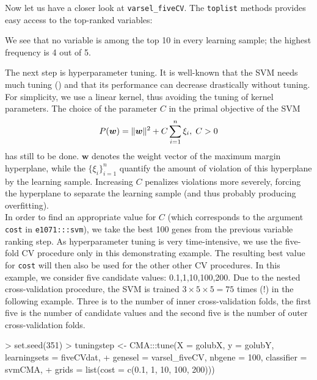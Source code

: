 Now let us have a closer look at \verb+varsel_fiveCV+. The \texttt{toplist}
methods provides easy access to the top-ranked variables:

\begin{Schunk}
\end{Schunk}

We see that no variable is among the top 10 in every learning sample; the highest
frequency is 4 out of 5.

The next step is hyperparameter tuning. It is well-known that the SVM
needs much tuning (\citet{Sta2005a}) and that its performance can decrease 
drastically without tuning. For simplicity, we use a linear kernel, thus avoiding the tuning of 
kernel parameters. The choice of the parameter $C$ in the primal objective
of the SVM
\begin{equation*}
P(\bm{w}) = \lVert\bm{w}\rVert^2 + C \sum_{i=1}^n \xi_i, \; C > 0
\end{equation*}
has still to be done. $$ denotes the weight vector of the maximum margin hyperplane,
while the $\{ \xi_i \}_{i=1}^n$ quantify the amount of violation of this
hyperplane by the learning sample. Increasing $C$ 
penalizes violations more severely, forcing the hyperplane to separate the
learning sample (and thus probably producing overfitting).\\
In order to find an appropriate value for $C$ (which corresponds to the argument
\texttt{cost} in \texttt{e1071:::svm}), we take the best 100 genes from the
previous variable ranking step. As hyperparameter tuning is very time-intensive, 
we use the five-fold CV procedure only
in this demonstrating example. The resulting best 
 value for \texttt{cost} will then also be used for the other other CV procedures. 
In this example, we consider five candidate values: 0.1,1,10,100,200.
Due to the nested cross-validation procedure, the SVM is trained 
$3   = 75$ times (!) in the following example. Three is to
the number of inner cross-validation folds, the first five is the number of candidate values
and the second five is the number of outer cross-validation folds.

\begin{Schunk}
\begin{Sinput}
> set.seed(351)
> tuningstep <- CMA:::tune(X = golubX, y = golubY, learningsets = fiveCVdat, 
+     genesel = varsel_fiveCV, nbgene = 100, classifier = svmCMA, 
+     grids = list(cost = c(0.1, 1, 10, 100, 200)))
\end{Sinput}
\end{Schunk}



